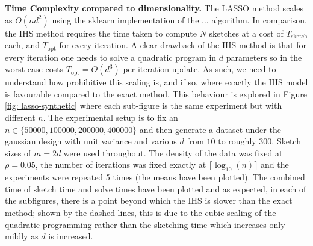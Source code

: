 \noindent\textbf{Time Complexity compared to dimensionality.}
The LASSO method scales as $O(nd^2)$ using the sklearn implementation of the ...
algorithm.
In comparison, the IHS method requires the time taken to compute $N$ sketches at
a cost of $T_{\text{sketch}}$ each, and $T_{\text{opt}}$ for every iteration.
A clear drawback of the IHS method is that for every iteration one needs to solve
a quadratic program in $d$ parameters so in the worst case costs $T_{\text{opt}}
= O(d^3)$ per iteration update.
As such, we need to understand how prohibitive this scaling is, and if so,
where exactly the IHS model is favourable compared to the exact method.
This behaviour is explored in Figure \ref{fig: lasso-synthetic} where each
sub-figure is the same experiment but with different $n$.
The experimental setup is to fix an $n \in \{ 50000, 100000, 200000, 400000 \}$
and then generate a dataset under the gaussian design with unit variance and
various $d$ from $10$ to roughly $300$.
Sketch sizes of $m = 2d$ were used throughout.
The density of the data was fixed at $\rho = 0.05$, the number of iterations was
fixed exactly at $\lceil \log_{10}(n) \rceil$ and the experiments were repeated 5 times (the
means have been plotted).
The combined time of sketch time and solve times have been plotted and
as expected, in each of the subfigures, there is a point beyond which the IHS
is slower than the exact method; shown by the dashed lines, this is due to the
cubic scaling of the quadratic programming rather than the sketching time which
increases only mildly as $d$ is increased.
